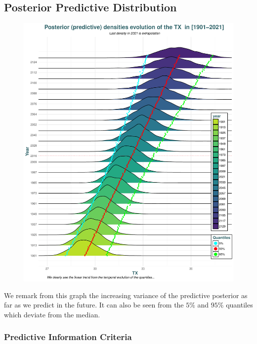  



\subsection{Posterior Predictive Distribution} 

 \begin{figure}[!htb]
  	\centering	\includegraphics[width=0.8\linewidth]{predpred.pdf}\caption{ }\label{fig:post_pred}
 \end{figure}
  
  
  We remark from this graph the increasing variance of the predictive posterior as far as we predict in the future. It can also be seen from the $5\%$ and $95\%$ quantiles which deviate from the median. 
  


\subsubsection*{Predictive Information Criteria}

